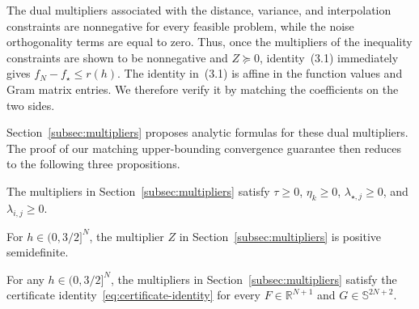 \documentclass[11pt, hidelinks]{article}
\begin{document}
The dual multipliers associated with the distance, variance, and interpolation constraints are nonnegative for every feasible problem, while the noise orthogonality terms are equal to zero. Thus, once the multipliers of the inequality constraints are shown to be nonnegative and $Z\succeq0$, identity~(3.1) immediately gives $f_N-f_\star\leq r(h)$.
The identity in~(3.1) is affine in the function values and Gram matrix entries. We therefore verify it by matching the coefficients on the two sides. 


Section~\ref{subsec:multipliers} proposes analytic formulas for these dual multipliers. The proof of our matching upper-bounding convergence guarantee then reduces to the following three propositions.
\begin{proposition}\label{prop:nonnegative-multipliers}
The multipliers in Section~\ref{subsec:multipliers} satisfy $\tau\ge0$, $\eta_k\ge0$, $\lambda_{\star,j}\ge0$, and $\lambda_{i,j}\ge0$.
\end{proposition}
\begin{proposition}\label{prop:psd-gram-multiplier}
For $h\in (0,3/2]^N$, the multiplier $Z$ in Section~\ref{subsec:multipliers} is positive semidefinite.
\end{proposition}
\begin{proposition}\label{prop:certificate-identity}
For any $h\in(0,3/2]^N$, the multipliers in Section~\ref{subsec:multipliers} satisfy the certificate identity~\eqref{eq:certificate-identity} for every $F\in\mathbb R^{N+1}$ and $G\in \mathbb{S}^{2N+2}$.
\end{proposition}
\end{document}
